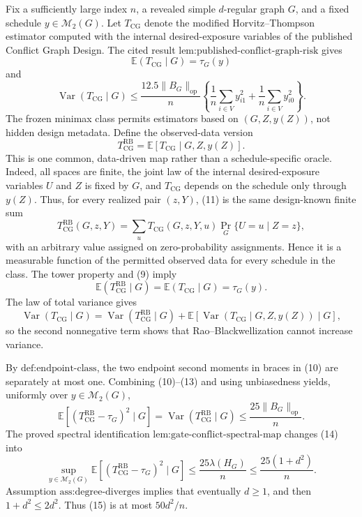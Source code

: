Fix a sufficiently large index \(n\), a revealed simple \(d\)-regular graph \(G\), and a fixed schedule \(y\in\mathcal M_2(G)\).  Let \(T_{\mathrm{CG}}\) denote the modified Horvitz--Thompson estimator computed with the internal desired-exposure variables of the published Conflict Graph Design.  The cited result \(\text{lem:published-conflict-graph-risk}\) gives
\[
\mathbb E(T_{\mathrm{CG}}\mid G)=\tau_G(y) \tag{9}
\]
and
\[
\operatorname{Var}(T_{\mathrm{CG}}\mid G)
\le \frac{12.5\|B_G\|_{\mathrm{op}}}{n}
\left\{\frac1n\sum_{i\in V}y_{i1}^2+
\frac1n\sum_{i\in V}y_{i0}^2\right\}. \tag{10}
\]
The frozen minimax class permits estimators based on \((G,Z,y(Z))\), not hidden design metadata.  Define the observed-data version
\[
T_{\mathrm{CG}}^{\mathrm{RB}}
=\mathbb E[T_{\mathrm{CG}}\mid G,Z,y(Z)]. \tag{11}
\]
This is one common, data-driven map rather than a schedule-specific oracle.  Indeed, all spaces are finite, the joint law of the internal desired-exposure variables \(U\) and \(Z\) is fixed by \(G\), and \(T_{\mathrm{CG}}\) depends on the schedule only through \(y(Z)\).  Thus, for every realized pair \((z,Y)\), (11) is the same design-known finite sum
\[
T_{\mathrm{CG}}^{\mathrm{RB}}(G,z,Y)
=\sum_u T_{\mathrm{CG}}(G,z,Y,u)\Pr_G\{U=u\mid Z=z\},
\]
with an arbitrary value assigned on zero-probability assignments.  Hence it is a measurable function of the permitted observed data for every schedule in the class.  The tower property and (9) imply
\[
\mathbb E(T_{\mathrm{CG}}^{\mathrm{RB}}\mid G)
=\mathbb E(T_{\mathrm{CG}}\mid G)=\tau_G(y). \tag{12}
\]
The law of total variance gives
\[
\operatorname{Var}(T_{\mathrm{CG}}\mid G)
=\operatorname{Var}(T_{\mathrm{CG}}^{\mathrm{RB}}\mid G)
+\mathbb E\!\left[\operatorname{Var}(T_{\mathrm{CG}}\mid G,Z,y(Z))\mid G\right], \tag{13}
\]
so the second nonnegative term shows that Rao--Blackwellization cannot increase variance.

By \(\text{def:endpoint-class}\), the two endpoint second moments in braces in (10) are separately at most one.  Combining (10)--(13) and using unbiasedness yields, uniformly over \(y\in\mathcal M_2(G)\),
\[
\mathbb E[(T_{\mathrm{CG}}^{\mathrm{RB}}-\tau_G)^2\mid G]
=\operatorname{Var}(T_{\mathrm{CG}}^{\mathrm{RB}}\mid G)
\le\frac{25\|B_G\|_{\mathrm{op}}}{n}. \tag{14}
\]
The proved spectral identification \(\text{lem:gate-conflict-spectral-map}\) changes (14) into
\[
\sup_{y\in\mathcal M_2(G)}
\mathbb E[(T_{\mathrm{CG}}^{\mathrm{RB}}-\tau_G)^2\mid G]
\le\frac{25\lambda(H_G)}{n}
\le\frac{25(1+d^2)}{n}. \tag{15}
\]
Assumption \(\text{ass:degree-diverges}\) implies that eventually \(d\ge1\), and then \(1+d^2\le2d^2\).  Thus (15) is at most \(50d^2/n\).

